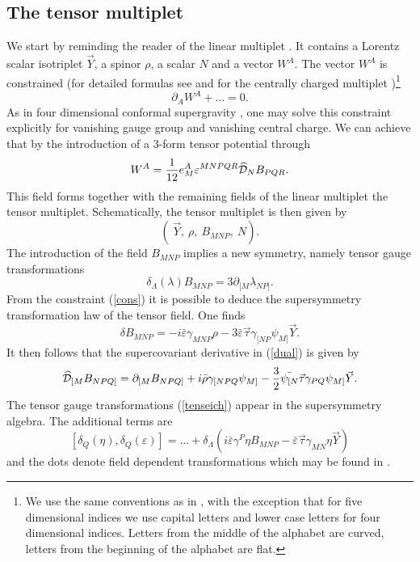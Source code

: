 \documentclass[a4paper,12pt, twoside]{article}
\numberwithin{equation}{section}
\begin{document}
\subsection{The tensor multiplet}\label{tenm}
We start by reminding the reader of the linear multiplet 
\cite{Zucker:1999fn}. It contains a Lorentz scalar isotriplet $\vec{Y}$, a spinor 
$\rho$, a scalar $N$ and a vector $W^A$. The vector $W^A$ is constrained 
(for detailed formulas see \cite{Zucker:1999fn} and for the centrally 
charged multiplet \cite{diss})\footnote{We use the same conventions as in 
\cite{Zucker:2000ej}, with the exception that for five dimensional 
indices we use capital letters and lower case letters for four dimensional 
indices. Letters from the middle of the alphabet are curved, letters 
from the beginning of the alphabet are flat.} 
\begin{equation}
\partial_A W^A+\ldots=0.\label{cons}
\end{equation}
As in four dimensional conformal supergravity \cite{deWit:1983na}, one 
may solve this constraint explicitly for vanishing gauge group and 
vanishing central charge. We can achieve that by  the introduction of a 
3-form tensor potential through
\begin{equation}
W^A = \frac{1}{12}e_M^A\varepsilon^{MNPQR}\widehat{\cal D}_N 
B_{PQR}\label{dual}.
\end{equation}
This field forms together with the remaining fields of the linear 
multiplet the tensor multiplet. Schematically, the tensor multiplet is then 
given by
\[
(~\vec{Y},~\rho,~ B_{MNP},~ N).
\]
The introduction of the field $B_{MNP}$ implies a new symmetry, namely 
tensor gauge transformations
\begin{equation}
\delta_\Lambda(\lambda)B_{MNP}=3\partial_{[M}\lambda_{NP]}.\label{tenseich} 
\end{equation}
From the constraint (\ref{cons}) it is possible to deduce the 
supersymmetry transformation law of the tensor field. One finds
\[
\delta B_{MNP} = 
-i\bar{\varepsilon}\gamma_{MNP}\rho-3\bar{\varepsilon}\vec{\tau}\gamma_{[NP}\psi_{M]}\vec{Y}.
\]
It then follows that the supercovariant derivative in (\ref{dual}) is 
given by 
\[
\widehat{\cal D}_{[M} B_{NPQ]} = \partial_{[M} 
B_{NPQ]}+i\bar{\rho}\gamma_{[NPQ}\psi_{M]}-\frac{3}{2}\bar{\psi_{[N}}\vec{\tau}\gamma_{PQ}\psi_{M]}\vec{Y}.
\]
The tensor gauge transformations (\ref{tenseich}) appear in the 
supersymmetry algebra. The additional terms are
\[
[\delta_Q(\eta),\delta_Q(\varepsilon)]=\ldots + 
\delta_\Lambda(i\bar{\varepsilon}\gamma^P\eta 
B_{MNP}-\bar{\varepsilon}\vec{\tau}\gamma_{MN}\eta\vec{Y})
\]
and the dots denote field dependent transformations which may be found 
in \cite{Zucker:2000ej}.
\end{document}
